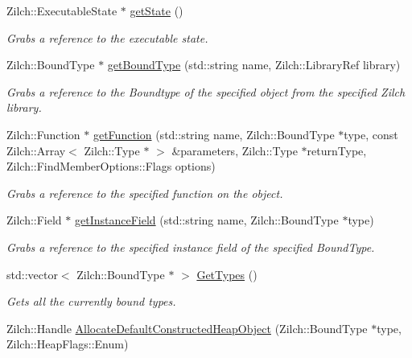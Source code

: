 \begin{DoxyCompactItemize}
\item 
Zilch\-::\-Executable\-State $\ast$ \hyperlink{classDCEngine_1_1Systems_1_1ZilchInterface_a1eec68a61415a13f1c8df1b189978b95}{get\-State} ()
\begin{DoxyCompactList}\small\item\em Grabs a reference to the executable state. \end{DoxyCompactList}\item 
Zilch\-::\-Bound\-Type $\ast$ \hyperlink{classDCEngine_1_1Systems_1_1ZilchInterface_a4d5a0042f6cacc16b448d1c6e27d0ff9}{get\-Bound\-Type} (std\-::string name, Zilch\-::\-Library\-Ref library)
\begin{DoxyCompactList}\small\item\em Grabs a reference to the Boundtype of the specified object from the specified Zilch library. \end{DoxyCompactList}\item 
Zilch\-::\-Function $\ast$ \hyperlink{classDCEngine_1_1Systems_1_1ZilchInterface_a72ee662c1b90dfd59258b5bdd512cb96}{get\-Function} (std\-::string name, Zilch\-::\-Bound\-Type $\ast$type, const Zilch\-::\-Array$<$ Zilch\-::\-Type $\ast$ $>$ \&parameters, Zilch\-::\-Type $\ast$return\-Type, Zilch\-::\-Find\-Member\-Options\-::\-Flags options)
\begin{DoxyCompactList}\small\item\em Grabs a reference to the specified function on the object. \end{DoxyCompactList}\item 
Zilch\-::\-Field $\ast$ \hyperlink{classDCEngine_1_1Systems_1_1ZilchInterface_a797b92d38f0a9be452bd21a00faadb63}{get\-Instance\-Field} (std\-::string name, Zilch\-::\-Bound\-Type $\ast$type)
\begin{DoxyCompactList}\small\item\em Grabs a reference to the specified instance field of the specified Bound\-Type. \end{DoxyCompactList}\item 
std\-::vector$<$ Zilch\-::\-Bound\-Type $\ast$ $>$ \hyperlink{classDCEngine_1_1Systems_1_1ZilchInterface_a4ba8ff5009cf4dba14710d2b2dfd674f}{Get\-Types} ()
\begin{DoxyCompactList}\small\item\em Gets all the currently bound types. \end{DoxyCompactList}\item 
Zilch\-::\-Handle \hyperlink{classDCEngine_1_1Systems_1_1ZilchInterface_ab36bdffb60cf41097bbf51f33cbf2c6f}{Allocate\-Default\-Constructed\-Heap\-Object} (Zilch\-::\-Bound\-Type $\ast$type, Zilch\-::\-Heap\-Flags\-::\-Enum)

\end{DoxyCompactItemize}
